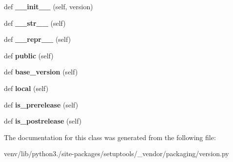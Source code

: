 \begin{DoxyCompactItemize}
\item 
\mbox{\label{classsetuptools_1_1__vendor_1_1packaging_1_1version_1_1_legacy_version_aa498bd8f6232be5f275db7847a871788}} 
def {\bfseries \+\_\+\+\_\+init\+\_\+\+\_\+} (self, version)
\item 
\mbox{\label{classsetuptools_1_1__vendor_1_1packaging_1_1version_1_1_legacy_version_a2d5d1dba9fe4763402aaf7bee0f5b950}} 
def {\bfseries \+\_\+\+\_\+str\+\_\+\+\_\+} (self)
\item 
\mbox{\label{classsetuptools_1_1__vendor_1_1packaging_1_1version_1_1_legacy_version_ae6ec300c777a71e70dd6bbde4d9d0abe}} 
def {\bfseries \+\_\+\+\_\+repr\+\_\+\+\_\+} (self)
\item 
\mbox{\label{classsetuptools_1_1__vendor_1_1packaging_1_1version_1_1_legacy_version_ae88e56fe4dc2f7c4a1604e247891323d}} 
def {\bfseries public} (self)
\item 
\mbox{\label{classsetuptools_1_1__vendor_1_1packaging_1_1version_1_1_legacy_version_ac993b34559a96834c19c38a6ce8f8066}} 
def {\bfseries base\+\_\+version} (self)
\item 
\mbox{\label{classsetuptools_1_1__vendor_1_1packaging_1_1version_1_1_legacy_version_a58852ae192cdead9bd5210febc0993f8}} 
def {\bfseries local} (self)
\item 
\mbox{\label{classsetuptools_1_1__vendor_1_1packaging_1_1version_1_1_legacy_version_ac9a68dca4cbd62604e30bc45aff7a972}} 
def {\bfseries is\+\_\+prerelease} (self)
\item 
\mbox{\label{classsetuptools_1_1__vendor_1_1packaging_1_1version_1_1_legacy_version_a7f770c4581549d9e3471ad2f6ec6c53c}} 
def {\bfseries is\+\_\+postrelease} (self)
\end{DoxyCompactItemize}


The documentation for this class was generated from the following file\+:\begin{DoxyCompactItemize}
\item 
venv/lib/python3./site-\/packages/setuptools/\+\_\+vendor/packaging/version.\+py\end{DoxyCompactItemize}
